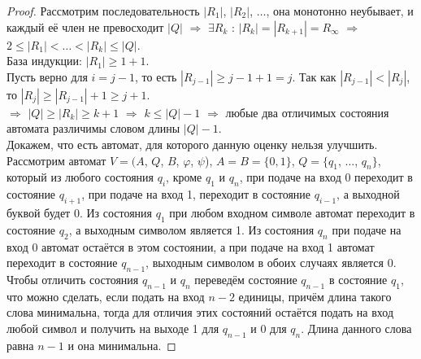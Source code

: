 \documentclass[a4paper, 12pt]{article}
\renewcommand{\phi}{\varphi}
\theoremstyle{definition}
\theoremstyle{plain}
\theoremstyle{remark}
\begin{document}
\begin{proof}
    Рассмотрим последовательность $|R_1|$, $|R_2|$, $\ldots$, она монотонно неубывает, и каждый её член не превосходит $|Q|$ $\Longrightarrow$ $\exists R_k$ : $|R_k|=|R_{k+1}|=R_{\infty}$ $\Longrightarrow$ $2\leqslant|R_1|<\ldots<|R_k|\leqslant|Q|$.\\
    База индукции: $|R_1|\geqslant1+1$.\\
    Пусть верно для $i=j-1$, то есть $|R_{j-1}|\geqslant j-1+1=j$. Так как $|R_{j-1}|<|R_j|$, то $|R_j|\geqslant|R_{j-1}|+1\geqslant j+1$.\\
    $\Longrightarrow$ $|Q|\geqslant|R_k|\geqslant k+1$ $\Longrightarrow$ $k\leqslant|Q|-1$ $\Longrightarrow$ любые два отличимых состояния автомата различимы словом длины $|Q|-1$.\\
    Докажем, что есть автомат, для которого данную оценку нельзя улучшить. Рассмотрим автомат $V=(A$, $Q$, $B$, $\phi$, $\psi$), $A=B=\{0,1\}$, $Q=\{q_1$, $\ldots$, $q_n\}$, который из любого состояния $q_i$, кроме $q_1$ и $q_n$, при подаче на вход 0 переходит в состояние $q_{i+1}$, при подаче на вход 1, переходит в состояние $q_{i-1}$, а выходной буквой будет 0. Из состояния $q_1$ при любом входном символе автомат переходит в состояние $q_2$, а выходным символом является 1. Из состояния $q_n$ при подаче на вход 0 автомат остаётся в  этом состоянии, а при подаче на вход 1 автомат переходит в состояние $q_{n-1}$, выходным символом в обоих случаях является 0.\\
    Чтобы отличить состояния $q_{n-1}$ и $q_n$ переведём состояние $q_{n-1}$ в состояние $q_1$, что можно сделать, если подать на вход $n-2$ единицы, причём длина такого слова минимальна, тогда для отличия этих состояний остаётся подать на вход любой символ и получить на выходе 1 для $q_{n-1}$ и 0 для $q_n$. Длина данного слова равна $n-1$ и она минимальна.
  \end{proof}
\end{document}
